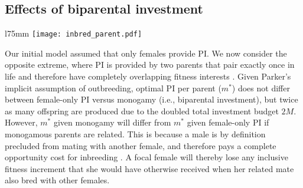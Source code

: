 \documentclass[10pt,letterpaper]{article}
\begin{document}
\subsection*{Effects of biparental investment}

\begin{wrapfigure}[14]{l}{75mm}
\texttt{[image: inbred\_parent.pdf]}
\captionsetup{labelformat=empty} 
\caption{} 
\label{inbred_parent} %
\end{wrapfigure} %
Our initial model assumed that only females provide PI. We now consider the opposite extreme, where PI is provided by two parents that pair exactly once in life and therefore have completely overlapping fitness interests \cite[i.e., strict monogamy;][]{Parker1985}. Given Parker's \citeyearpar{Parker1985} implicit assumption of outbreeding, optimal PI per parent ($m^{*}$) does not differ between female-only PI versus monogamy (i.e., biparental investment), but twice as many offspring are produced due to the doubled total investment budget $2M$. However, $m^{*}$ given monogamy will differ from $m^{*}$ given female-only PI if monogamous parents are related. This is because a male is by definition precluded from mating with another female, and therefore pays a complete opportunity cost for inbreeding \cite[][]{Waser1986}. A focal female will thereby lose any inclusive fitness increment that she would have otherwise received when her related mate also bred with other females.
\end{document}
